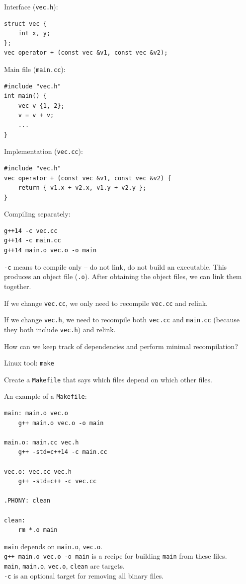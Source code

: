 \documentclass[11pt]{article}
\theoremstyle{definition}
\begin{document}
Interface ({\tt vec.h}):
\begin{lstlisting}
struct vec {
    int x, y;
};
vec operator + (const vec &v1, const vec &v2);
\end{lstlisting}
Main file ({\tt main.cc}):
\begin{lstlisting}
#include "vec.h"
int main() {
    vec v {1, 2};
    v = v + v;
    ...
}
\end{lstlisting}
Implementation ({\tt vec.cc}):
\begin{lstlisting}
#include "vec.h"
vec operator + (const vec &v1, const vec &v2) {
    return { v1.x + v2.x, v1.y + v2.y };
}
\end{lstlisting}
Compiling separately:
\begin{verbatim}
g++14 -c vec.cc 
g++14 -c main.cc
g++14 main.o vec.o -o main
\end{verbatim}
{\tt -c} means to compile only -- do not link, do not build an executable. This produces an object file ({\tt .o}). After obtaining the object files, we can link them together.

If we change {\tt vec.cc}, we only need to recompile {\tt vec.cc} and relink.

If we change {\tt vec.h}, we need to recompile both {\tt vec.cc} and {\tt main.cc} (because they both include {\tt vec.h}) and relink.

How can we keep track of dependencies and perform minimal recompilation? 

Linux tool: {\tt make}

Create a {\tt Makefile} that says which files depend on which other files. 

An example of a {\tt Makefile}:
\begin{verbatim}
main: main.o vec.o
    g++ main.o vec.o -o main
    
main.o: main.cc vec.h
    g++ -std=c++14 -c main.cc
    
vec.o: vec.cc vec.h
    g++ -std=c++ -c vec.cc
    
.PHONY: clean

clean:
    rm *.o main
\end{verbatim}
{\tt main} depends on {\tt main.o}, {\tt vec.o}. \\
{\tt g++ main.o vec.o -o main} is a recipe for building {\tt main} from these files. \\
{\tt main}, {\tt main.o}, {\tt vec.o}, {\tt clean} are targets. \\
{\tt -c} is an optional target for removing all binary files.
\end{document}

